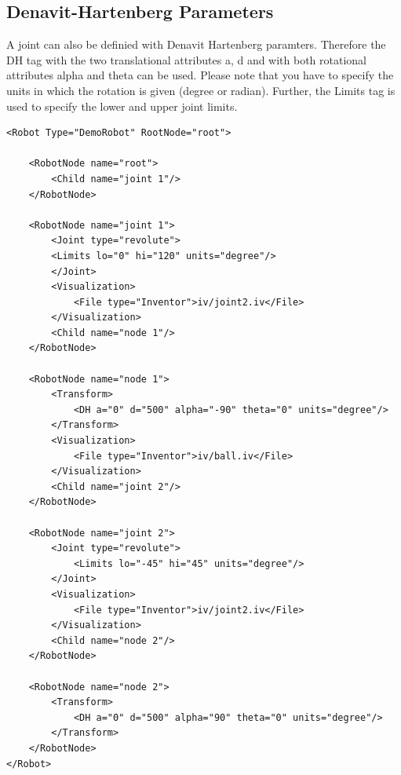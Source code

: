 \subsection{Denavit-Hartenberg Parameters}
\par
A joint can also be definied with Denavit Hartenberg paramters. Therefore the DH tag with the two translational attributes a, d and with both rotational attributes alpha and theta can be used. Please note that you have to specify the units in which the rotation is given (degree or radian). Further, the Limits tag is used to specify the lower and upper joint limits. 
\begin{lstlisting}
<Robot Type="DemoRobot" RootNode="root">

    <RobotNode name="root">
        <Child name="joint 1"/>
    </RobotNode>

    <RobotNode name="joint 1">
        <Joint type="revolute">
        <Limits lo="0" hi="120" units="degree"/>
        </Joint>
        <Visualization>
            <File type="Inventor">iv/joint2.iv</File>
        </Visualization>
        <Child name="node 1"/>
    </RobotNode>

    <RobotNode name="node 1">
        <Transform>
            <DH a="0" d="500" alpha="-90" theta="0" units="degree"/>
        </Transform>
        <Visualization>
            <File type="Inventor">iv/ball.iv</File>
        </Visualization>
        <Child name="joint 2"/>
    </RobotNode>

    <RobotNode name="joint 2">
        <Joint type="revolute">
            <Limits lo="-45" hi="45" units="degree"/>
        </Joint>
        <Visualization>
            <File type="Inventor">iv/joint2.iv</File>
        </Visualization>
        <Child name="node 2"/>
    </RobotNode>

    <RobotNode name="node 2">
        <Transform>
            <DH a="0" d="500" alpha="90" theta="0" units="degree"/>
        </Transform>
    </RobotNode>
</Robot>
\end{lstlisting}
\par
